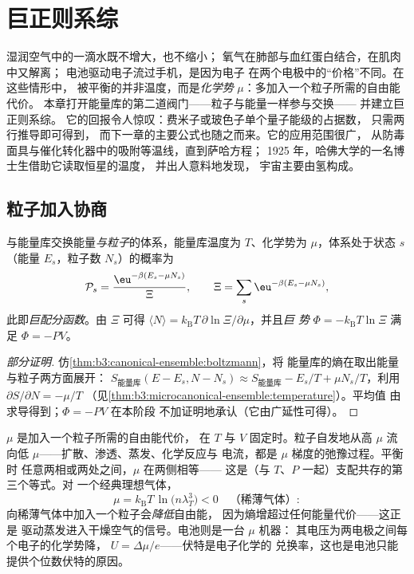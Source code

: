 \chapter{巨正则系综}\label{ch:b3:grand-canonical}

湿润空气中的一滴水既不增大，也不缩小；
氧气在肺部与血红蛋白结合，在肌肉中又解离；
电池驱动电子流过手机，是因为电子
在两个电极中的“价格”不同。在这些情形中，
被平衡的并非温度，而是\emph{化学势}
$\mu$：多加入一个粒子所需的自由能代价。
本章打开能量库的第二道阀门——粒子与能量一样参与交换——
并建立巨正则系综。
它的回报令人惊叹：费米子或玻色子单个量子能级的占据数，
只需两行推导即可得到，
而下一章的主要公式也随之而来。它的应用范围很广，
从防毒面具与催化转化器中的吸附等温线，直到萨哈方程；
1925 年，哈佛大学的一名博士生借助它读取恒星的温度，
并出人意料地发现，
宇宙主要由氢构成。

\section{粒子加入协商}

\begin{theorem}[巨正则分布]\label{thm:b3:grand-canonical:distribution}
与能量库交换能量\emph{与粒子}的体系，能量库温度为
$T$、化学势为 $\mu$，体系处于状态 $s$
（能量 $E_s$，粒子数 $N_s$）的概率为
\[
\mathcal P_s = \frac{\eu^{-\beta(E_s - \mu N_s)}}{\Xi} , \qquad
\Xi = \sum_s\eu^{-\beta(E_s - \mu N_s)} ,
\]
此即\emph{巨配分函数}。由 $\Xi$ 可得 $\langle N\rangle
= k_{\text{B}}T\,\partial\ln\Xi/\partial\mu$，并且\emph{巨
势} $\Phi = -k_{\text{B}}T\ln\Xi$ 满足 $\Phi = -PV$。
\end{theorem}

\begin{proof}[部分证明]
仿\cref{thm:b3:canonical-ensemble:boltzmann}，将
能量库的熵在取出能量与粒子两方面展开：
$S_{\text{能量库}}(E - E_s, N - N_s) \approx S_{\text{能量库}} - E_s/T +
\mu N_s/T$，利用 $\partial S/\partial N = -\mu/T$
（见\cref{thm:b3:microcanonical-ensemble:temperature}）。平均值
由求导得到；$\Phi = -PV$ 在本阶段
不加证明地承认（它由广延性可得）。
\end{proof}

\begin{definition}[$\mu$ 的含义]\label{def:b3:grand-canonical:mu}
$\mu$ 是加入一个粒子所需的自由能代价，
在 $T$ 与 $V$ 固定时。粒子自发地从高 $\mu$ 流向低
$\mu$——扩散、渗透、蒸发、化学反应与
电流，都是 $\mu$ 梯度的弛豫过程。平衡时
任意两相或两处之间，$\mu$ 在两侧相等——
这是（与 $T$、$P$ 一起）支配共存的第三个等式。对
一个经典理想气体，
\[
\mu = k_{\text{B}}T\,\ln\!\big(n\lambda_T^3\big) < 0
\quad\text{（稀薄气体）} :
\]
向稀薄气体中加入一个粒子会\emph{降低}自由能，
因为熵增超过任何能量代价——这正是
驱动蒸发进入干燥空气的信号。电池则是一台 $\mu$ 机器：
其电压为两电极之间每个电子的化学势降，
$U = \Delta\mu/e$——伏特是电子化学的
兑换率，这也是电池只能提供个位数伏特的原因。
\end{definition}

